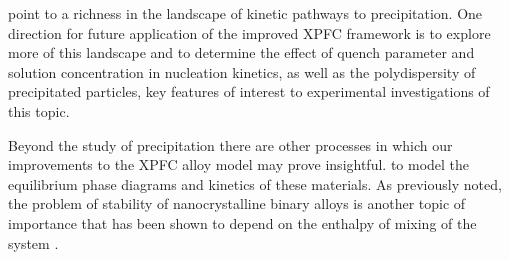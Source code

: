 
 point to a richness in 
the landscape of kinetic pathways to precipitation. One direction for future application of the improved XPFC framework is to explore more of this landscape and to determine the effect of quench parameter and solution concentration in nucleation kinetics, as well as the  polydispersity of precipitated particles, key features of interest to experimental investigations of this topic.


Beyond the study of precipitation there are other processes in which our improvements
to the XPFC alloy model may prove insightful.  to model the equilibrium phase diagrams and kinetics 
of these materials. As previously noted, the problem of stability of nanocrystalline binary 
alloys is another topic of importance that has  been shown to depend on the enthalpy 
of mixing of the system \cite{MURDOCH13}.

